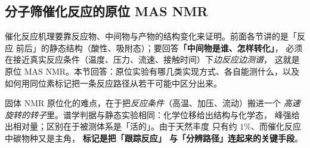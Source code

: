 
\subsection{分子筛催化反应的原位 MAS NMR}
\label{sec:ch08-insitu}

\begin{probout}
催化反应机理要靠反应物、中间物与产物的结构变化来证明。前面各节讲的是「反应
前后」的静态结构（酸性、吸附态）；要回答\textbf{「中间物是谁、怎样转化」}，
必须在接近真实反应条件（温度、压力、流速、接触时间）下\emph{边反应边测谱}，
这就是原位 MAS NMR。本节回答：原位实验有哪几类实现方式、各自能测什么，以及
如何用同位素标记把一条反应路径从若干可能中区分出来。
\end{probout}

\begin{principle}
固体 NMR 原位化的难点，在于把\emph{反应条件}（高温、加压、流动）搬进一个
\emph{高速旋转的转子}里。谱学判据与静态实验相同：化学位移给出结构与化学态，
峰强给出相对量；区别在于被测体系是「活的」。由于天然丰度  只有约
$1\%$、而催化反应中碳物种又是主角，\textbf{ 标记是把「跟踪反应」
与「分辨路径」连起来的关键手段}。
\end{principle}


